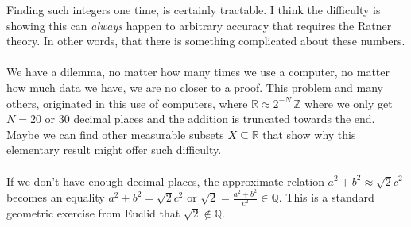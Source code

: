 \documentclass[12pt]{article}
\begin{document}
Finding such integers one time, is certainly tractable.  I think the difficulty is showing this can \textit{always} happen to arbitrary accuracy that requires the Ratner theory.  In other words, that there is something complicated about these numbers. \\ \\ 
We have a dilemma, no matter how many times we use a computer, no matter how much data we have, we are no closer to a proof.  This problem and many others, originated in this use of computers, where $\mathbb{R}\approx 2^{-N}\,\mathbb{Z}$ where we only get $N = 20$ or $30$ decimal places and the addition is truncated towards the end. Maybe we can find other measurable subsets $X \subseteq \mathbb{R}$ that show why this elementary result might offer such difficulty.   \\ \\
If we don't have enough decimal places, the approximate relation $a^2 + b^2 \approx \sqrt{2}c^2$ becomes an equality $a^2 + b^2 \mathbf{=} \sqrt{2}c^2$ or $\sqrt{2} = \frac{a^2+b^2}{c^2} \in \mathbb{Q}$.  This is a standard geometric exercise from Euclid that $\sqrt{2} \notin \mathbb{Q}$.
\end{document}
